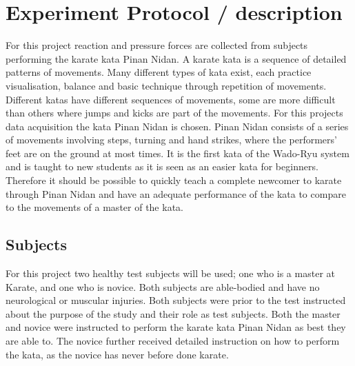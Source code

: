 \section{Experiment Protocol / description} %

For this project reaction and pressure forces are collected from subjects performing the karate kata Pinan Nidan. %
A karate kata is a sequence of detailed patterns of movements. Many different types of kata exist, each practice visualisation, balance and basic technique through repetition of movements. Different katas have different sequences of movements, some are more difficult than others where jumps and kicks are part of the movements. For this projects data acquisition the kata Pinan Nidan is chosen. Pinan Nidan consists of a series of movements involving steps, turning and hand strikes, where the performers' feet are on the ground at most times. It is the first kata of the Wado-Ryu system and is taught to new students as it is seen as an easier kata for beginners. \cite{Mccarthy1987, Dojo2018} Therefore it should be possible to quickly teach a complete newcomer to karate through Pinan Nidan and have an adequate performance of the kata to compare to the movements of a master of the kata. 

\subsection{Subjects} %
For this project two healthy test subjects will be used; one who is a master at Karate, and one who is novice. Both subjects are able-bodied and have no neurological or muscular injuries. Both subjects were prior to the test instructed about the purpose of the study and their role as test subjects. Both the master and novice were instructed to perform the karate kata Pinan Nidan as best they are able to. The novice further received detailed instruction on how to perform the kata, as the novice has never before done karate. 






